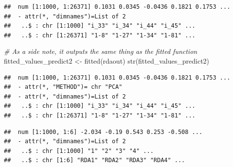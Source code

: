 \documentclass[
]{article}
\newenvironment{Shaded}{\begin{snugshade}}{\end{snugshade}}
\newcommand{\AttributeTok}[1]{\textcolor[rgb]{0.77,0.63,0.00}{#1}}
\newcommand{\CommentTok}[1]{\textcolor[rgb]{0.56,0.35,0.01}{\textit{#1}}}
\newcommand{\DecValTok}[1]{\textcolor[rgb]{0.00,0.00,0.81}{#1}}
\newcommand{\FunctionTok}[1]{\textcolor[rgb]{0.00,0.00,0.00}{#1}}
\newcommand{\NormalTok}[1]{#1}
\newcommand{\OtherTok}[1]{\textcolor[rgb]{0.56,0.35,0.01}{#1}}
\newcommand{\SpecialCharTok}[1]{\textcolor[rgb]{0.00,0.00,0.00}{#1}}
\newcommand{\StringTok}[1]{\textcolor[rgb]{0.31,0.60,0.02}{#1}}
\begin{document}
\begin{verbatim}
##  num [1:1000, 1:26371] 0.1031 0.0345 -0.0436 0.1821 0.1753 ...
##  - attr(*, "dimnames")=List of 2
##   ..$ : chr [1:1000] "i_33" "i_34" "i_44" "i_45" ...
##   ..$ : chr [1:26371] "1-8" "1-27" "1-34" "1-81" ...
\end{verbatim}

\begin{Shaded}
\begin{Highlighting}[]
  \CommentTok{\# As a side note, it outputs the same thing as the \textasciigrave{}fitted\textasciigrave{} function}
\NormalTok{  fitted\_values\_predict2 }\OtherTok{\textless{}{-}} \FunctionTok{fitted}\NormalTok{(rdaout)}
  \FunctionTok{str}\NormalTok{(fitted\_values\_predict2)}
\end{Highlighting}
\end{Shaded}

\begin{verbatim}
##  num [1:1000, 1:26371] 0.1031 0.0345 -0.0436 0.1821 0.1753 ...
##  - attr(*, "METHOD")= chr "PCA"
##  - attr(*, "dimnames")=List of 2
##   ..$ : chr [1:1000] "i_33" "i_34" "i_44" "i_45" ...
##   ..$ : chr [1:26371] "1-8" "1-27" "1-34" "1-81" ...
\end{verbatim}

\begin{Shaded}
\end{Shaded}

\begin{verbatim}
##  num [1:1000, 1:6] -2.034 -0.19 0.543 0.253 -0.508 ...
##  - attr(*, "dimnames")=List of 2
##   ..$ : chr [1:1000] "1" "2" "3" "4" ...
##   ..$ : chr [1:6] "RDA1" "RDA2" "RDA3" "RDA4" ...
\end{verbatim}
\end{document}
